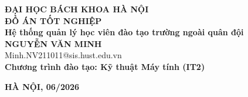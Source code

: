 \documentclass[DoAn.tex]{subfiles}
\begin{document}
\begin{titlepage}
\thispagestyle{empty}
\begin{center}

{\textbf{\large ĐẠI HỌC BÁCH KHOA HÀ NỘI}}\\[1.5cm]

{\textbf{\huge ĐỒ ÁN TỐT NGHIỆP}}\\[0.8cm]
{\textbf{\Large Hệ thống quản lý học viên đào tạo trường ngoài quân đội}}\\[0.8cm]

{\textbf{\large NGUYỄN VĂN MINH}}\\
{\large Minh.NV211011@sis.hust.edu.vn}\\[0.4cm]

{\textbf{\large Chương trình đào tạo: Kỹ thuật Máy tính (IT2)}}\\[1cm]

\vfill

\begin{table}[H]
\centering
{}
\end{table}

\vfill
{\textbf{\large HÀ NỘI, 06/2026}}
\end{center}

\end{titlepage}
\end{document}
